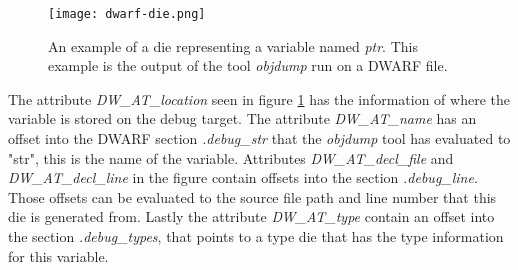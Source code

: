\begin{figure}[h]
	\centering
	\texttt{[image: dwarf-die.png]}
	\caption{An example of a \gls{die} representing a variable named \emph{ptr}. This example is the output of the tool \emph{objdump} run on a \gls{DWARF} file.}
	\label{fig:dwarfdie}
\end{figure}


The attribute \emph{DW\_AT\_location} seen in figure \ref{fig:dwarfdie} has the information of where the variable is stored on the debug target.
The attribute \emph{DW\_AT\_name} has an offset into the \gls{DWARF} section \emph{.debug\_str} that the \emph{objdump} tool has evaluated to "str", this is the name of the variable.
Attributes \emph{DW\_AT\_decl\_file} and \emph{DW\_AT\_decl\_line} in the figure contain  offsets into the section \emph{.debug\_line}.
Those offsets can be evaluated to the source file path and line number that this \gls{die} is generated from.
Lastly the attribute \emph{DW\_AT\_type} contain an offset into the section \emph{.debug\_types}, that points to a type \gls{die} that has the type information for this variable.


